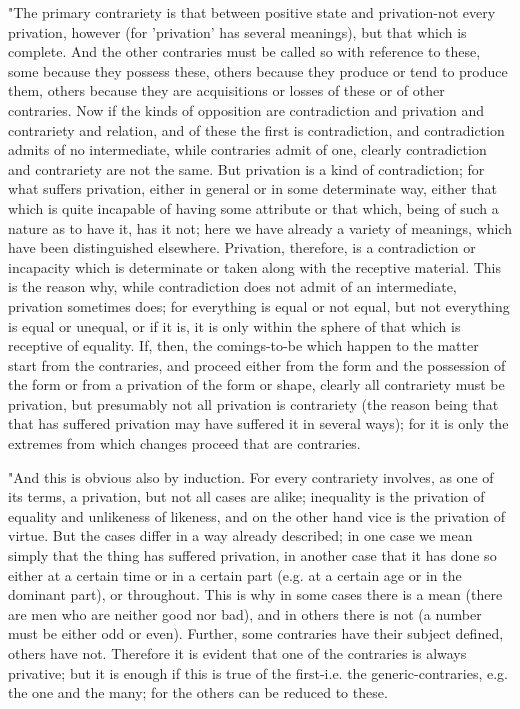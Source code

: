 "The primary contrariety is that between positive state and privation-not
every privation, however (for 'privation' has several meanings), but
that which is complete. And the other contraries must be called so
with reference to these, some because they possess these, others because
they produce or tend to produce them, others because they are acquisitions
or losses of these or of other contraries. Now if the kinds of opposition
are contradiction and privation and contrariety and relation, and
of these the first is contradiction, and contradiction admits of no
intermediate, while contraries admit of one, clearly contradiction
and contrariety are not the same. But privation is a kind of contradiction;
for what suffers privation, either in general or in some determinate
way, either that which is quite incapable of having some attribute
or that which, being of such a nature as to have it, has it not; here
we have already a variety of meanings, which have been distinguished
elsewhere. Privation, therefore, is a contradiction or incapacity
which is determinate or taken along with the receptive material. This
is the reason why, while contradiction does not admit of an intermediate,
privation sometimes does; for everything is equal or not equal, but
not everything is equal or unequal, or if it is, it is only within
the sphere of that which is receptive of equality. If, then, the comings-to-be
which happen to the matter start from the contraries, and proceed
either from the form and the possession of the form or from a privation
of the form or shape, clearly all contrariety must be privation, but
presumably not all privation is contrariety (the reason being that
that has suffered privation may have suffered it in several ways);
for it is only the extremes from which changes proceed that are contraries.

"And this is obvious also by induction. For every contrariety involves,
as one of its terms, a privation, but not all cases are alike; inequality
is the privation of equality and unlikeness of likeness, and on the
other hand vice is the privation of virtue. But the cases differ in
a way already described; in one case we mean simply that the thing
has suffered privation, in another case that it has done so either
at a certain time or in a certain part (e.g. at a certain age or in
the dominant part), or throughout. This is why in some cases there
is a mean (there are men who are neither good nor bad), and in others
there is not (a number must be either odd or even). Further, some
contraries have their subject defined, others have not. Therefore
it is evident that one of the contraries is always privative; but
it is enough if this is true of the first-i.e. the generic-contraries,
e.g. the one and the many; for the others can be reduced to these.


